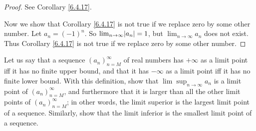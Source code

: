 \begin{proof}
    See Corollary \ref{6.4.17}.

    Now we show that Corollary \ref{6.4.17} is not true if we replace zero by some other number.
    Let \(a_n = (-1)^n\).
    So \(\lim_{n \to \infty} \abs*{a_n} = 1\), but \(\lim_{n \to \infty} a_n\) does not exist.
    Thus Corollary \ref{6.4.17} is not true if we replace zero by some other number.
\end{proof}

\begin{exercise}\label{ex 6.4.8}
    Let us say that a sequence \((a_n)_{n = M}^\infty\) of real numbers has \(+\infty\) as a limit point iff it has no finite upper bound, and that it has \(-\infty\) as a limit point iff it has no finite lower bound.
    With this definition, show that \(\lim\sup_{n \to \infty} a_n\) is a limit point of \((a_n)_{n = M}^\infty\), and furthermore that it is larger than all the other limit points of \((a_n)_{n = M}^\infty\);
    in other words, the limit superior is the largest limit point of a sequence.
    Similarly, show that the limit inferior is the smallest limit point of a sequence.
\end{exercise}

